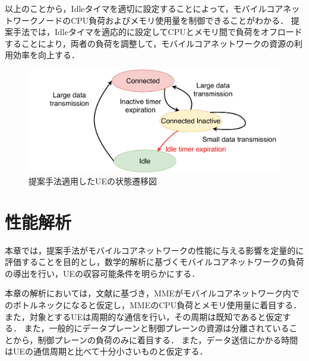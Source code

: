 \documentclass[technicalreport]{ieicej-rev}
\begin{document}
以上のことから，Idleタイマを適切に設定することによって，モバイルコアネットワークノードのCPU負荷およびメモリ使用量を制御できることがわかる．
提案手法では，Idleタイマを適応的に設定してCPUとメモリ間で負荷をオフロードすることにより，両者の負荷を調整して，モバイルコアネットワークの資源の利用効率を向上する．

\begin{figure}[!t]
  \centering
  \includegraphics[width=1.0\hsize]{state_change_propose.pdf}
  \caption{提案手法適用したUEの状態遷移図}
  \label{state_change_propose}
\end{figure}

\section{性能解析}
\label{sec:解析}
本章では，提案手法がモバイルコアネットワークの性能に与える影響を定量的に評価することを目的とし，数学的解析に基づくモバイルコアネットワークの負荷の導出を行い，UEの収容可能条件を明らかにする．

本章の解析においては，文献\cite{ACloudNativeSolutionforDynamicAutoScalingofMMEinLTE}に基づき，MMEがモバイルコアネットワーク内でのボトルネックになると仮定し，MMEのCPU負荷とメモリ使用量に着目する．
また，対象とするUEは周期的な通信を行い，その周期は既知であると仮定する．
また，一般的にデータプレーンと制御プレーンの資源は分離されていることから，制御プレーンの負荷のみに着目する．
また，データ送信にかかる時間はUEの通信周期と比べて十分小さいものと仮定する．
\end{document}
